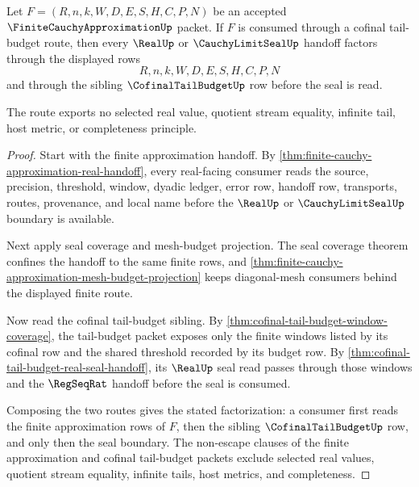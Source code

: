 \begin{theorem}
\label{thm:finite-cauchy-approximation-cofinal-tail-budget-route}
Let $F=(R,n,k,W,D,E,S,H,C,P,N)$ be an accepted $\FiniteCauchyApproximationUp$ packet. If $F$ is consumed through a cofinal tail-budget route, then every $\RealUp$ or $\CauchyLimitSealUp$ handoff factors through the displayed rows
$$
R,n,k,W,D,E,S,H,C,P,N
$$
and through the sibling $\CofinalTailBudgetUp$ row before the seal is read.

The route exports no selected real value, quotient stream equality, infinite tail, host metric, or completeness principle.
\end{theorem}
\begin{proof}
Start with the finite approximation handoff. By \autoref{thm:finite-cauchy-approximation-real-handoff}, every real-facing consumer reads the source, precision, threshold, window, dyadic ledger, error row, handoff row, transports, routes, provenance, and local name before the $\RealUp$ or $\CauchyLimitSealUp$ boundary is available.

Next apply seal coverage and mesh-budget projection. The seal coverage theorem confines the handoff to the same finite rows, and \autoref{thm:finite-cauchy-approximation-mesh-budget-projection} keeps diagonal-mesh consumers behind the displayed finite route.

Now read the cofinal tail-budget sibling. By \autoref{thm:cofinal-tail-budget-window-coverage}, the tail-budget packet exposes only the finite windows listed by its cofinal row and the shared threshold recorded by its budget row. By \autoref{thm:cofinal-tail-budget-real-seal-handoff}, its $\RealUp$ seal read passes through those windows and the $\RegSeqRat$ handoff before the seal is consumed.

Composing the two routes gives the stated factorization: a consumer first reads the finite approximation rows of $F$, then the sibling $\CofinalTailBudgetUp$ row, and only then the seal boundary. The non-escape clauses of the finite approximation and cofinal tail-budget packets exclude selected real values, quotient stream equality, infinite tails, host metrics, and completeness.
\end{proof}


